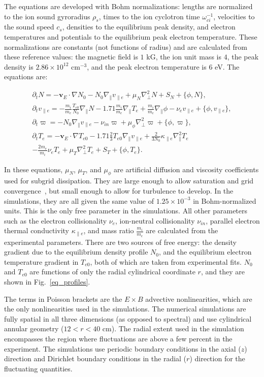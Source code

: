 \documentclass[showpacs,preprintnumbers,amsmath,amssymb,superscriptaddress,aip]{revtex4-1}
\def\beqar{\begin{eqnarray}}
\def\eeqar{\end{eqnarray}}
\newcommand{\pdt}{\partial_t}
\def\grad{\nabla}
\newcommand{\gradpar}{\grad_\parallel}
\newcommand{\gradperp}{\grad_\perp}
\newcommand{\vpe}{v_{\parallel e}}
\newcommand{\nue}{\nu_{e}}
\newcommand{\nuin}{\nu_{in}}
\newcommand{\kpe}{\kappa_{\parallel e}}
\newcommand{\fmie}{\frac{m_i}{m_e}}
\begin{document}
The equations are developed with Bohm normalizations: lengths are
normalized to the ion sound gyroradius $\rho_s$, times to the ion
cyclotron time $\omega_{ci}^{-1}$, velocities to the sound speed $c_s$, densities to the equilibrium peak density, and electron
temperatures and potentials to the equilibrium peak electron temperature. These normalizations are constants (not functions of radius) and are calculated from these reference values:
the magnetic field is $1$ kG, the ion unit mass is $4$, the peak density is $2.86 \times 10^{12}$ cm$^{-3}$, and the peak electron temperature
is $6$ eV. The equations are:

\beqar
\label{ni_eq}
\pdt N = - {\mathbf v_E} \cdot \grad N_0 - N_0 \gradpar \vpe + \mu_N \gradperp^2 N + S_N + \{\phi,N\}, \\
\label{ve_eq}
\pdt \vpe = - \fmie \frac{T_{e0}}{N_0} \gradpar N - 1.71 \fmie \gradpar T_e  + \fmie \gradpar \phi - \nue \vpe + \{\phi,\vpe \}, \\
\label{rho_eq}
\pdt \varpi = - N_0 \gradpar \vpe  - \nuin \varpi + \mu_\phi \gradperp^2 \varpi + \{\phi,\varpi \}, \\
\label{te_eq}
\pdt T_e = - {\mathbf v_E} \cdot \grad T_{e0} - 1.71 \frac{2}{3} T_{e0} \gradpar \vpe + \frac{2}{3 N_0} \kpe \gradpar^2 T_e  \nonumber \\
- \frac{2 m_e}{m_i} \nue T_e  + \mu_T \gradperp^2 T_e +  S_T + \{\phi,T_e\}.
\eeqar

In these equations, $\mu_N$, $\mu_T$, and $\mu_\phi$ are artificial diffusion and viscosity coefficients used for subgrid dissipation. They are large enough to allow saturation
and grid convergence~\cite{friedman2012}, but small enough to allow for turbulence to develop. In the simulations, they are all given the same value of $1.25 \times 10^{-3}$ in Bohm-normalized units. 
This is the only free parameter in the simulations. All other parameters such as the electron collisionality $\nue$, ion-neutral
collisionality $\nuin$, parallel electron thermal conductivity $\kpe$, and mass ratio $\fmie$ are calculated from the experimental parameters.
There are two sources of free energy: the density gradient due to the equilibrium density profile $N_0$, and the equilibrium electron temperature gradient in $T_{e0}$, both of which are
taken from experimental fits. $N_0$ and $T_{e0}$ are functions of only the radial cylindrical coordinate $r$, and they are shown in Fig.~\ref{eq_profiles}. 

The terms in Poisson brackets are the $E \times B$ advective nonlinearities, which are the only nonlinearities used in the simulations.
The numerical simulations are fully spatial in all three dimensions (as opposed to spectral) and use cylindrical annular geometry ($12<r<40$ cm). The radial extent used in the simulation
encompasses the region where fluctuations are above a few percent in the experiment.
The simulations use periodic boundary conditions in the axial ($z$) direction and Dirichlet boundary
conditions in the radial ($r$) direction for the fluctuating quantities. 
\end{document}
